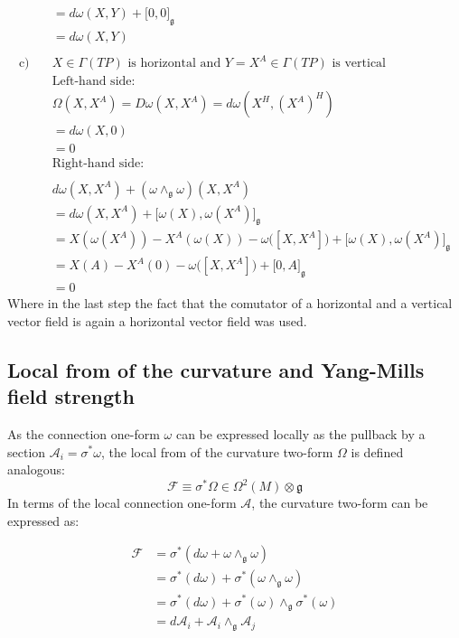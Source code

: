 \begin{align*}
  &= d\omega(X,Y) + \big[ 0, 0 \big]_\mathfrak{g} \\
  &= d\omega(X,Y) \\
  \\
  \text{c)} \quad & X \in \Gamma(TP) \text{ is horizontal and } Y=X^A \in \Gamma(TP) \text{ is vertical} \\
      & \text{Left-hand side:} \\
  &\Omega(X,X^A) = D\omega(X,X^A) = d\omega(X^H, (X^A)^H) \\
  &= d\omega(X, 0) \\
  &= 0 \\
    &\text{Right-hand side:} \\
    \\
  &d\omega(X,X^A) + (\omega \wedge_{\mathfrak{g}} \omega)(X,X^A) \\
  &= d\omega(X, X^A) + \big[ \omega(X), \omega(X^A) \big]_\mathfrak{g} \\
  &= X(\omega(X^A)) - X^A(\omega(X)) - \omega\big( [X,X^A] \big) + \big[ \omega(X), \omega(X^A) \big]_\mathfrak{g} \\
  &= X(A) - X^A(0) - \omega\big( [X,X^A] \big) + \big[ 0, A \big]_\mathfrak{g} \\
  &= 0
\end{align*}
Where in the last step the fact that the comutator of a horizontal and a vertical vector field is again a horizontal vector field was used\cite{NakaharaGeometrytopologyphysics2005}.


\subsection{Local from of the curvature and Yang-Mills field strength}

As the connection one-form $\omega$ can be expressed locally as the pullback by a section $\mathcal{A}_i = \sigma^*\omega$, the local from of the curvature two-form $\Omega$ is defined analogous\cite{NakaharaGeometrytopologyphysics2005}:
\[ \mathscr{F} \equiv \sigma^*\Omega \in \Omega^2(M)\otimes\mathfrak{g} \]
In terms of the local connection one-form $\mathcal{A}$, the curvature two-form can be expressed as:

\begin{align*}
  \mathscr{F} &= \sigma^*(d\omega + \omega \wedge_\mathfrak{g} \omega) \\
  &= \sigma^*(d\omega) + \sigma^*(\omega \wedge_\mathfrak{g} \omega) \\
  &= \sigma^*(d\omega) + \sigma^*(\omega) \wedge_\mathfrak{g} \sigma^*(\omega) \\
  &= d\mathcal{A}_i + \mathcal{A}_i \wedge_\mathfrak{g} \mathcal{A}_j
\end{align*}

